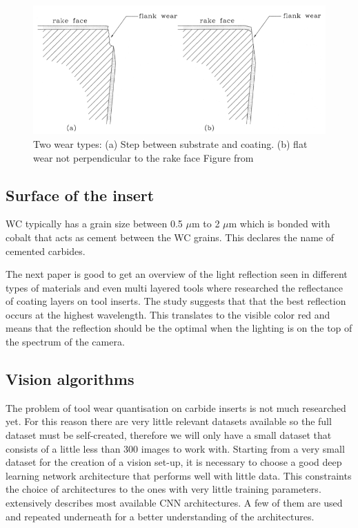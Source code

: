 	\begin{figure}[hbtp]
	\centering
	\includegraphics[scale=0.4]{fig/algemeen/plaatjes/Figuren/wear_types.png}
	\caption{Two wear types: (a) Step between substrate and coating. (b) flat wear not perpendicular to the rake face Figure from \citep{Gu1999}}
	\label{fig:gen:insertwears}
	\end{figure}

			
\subsection{Surface of the insert}
\label{sec:lit:surface}
	WC typically has a grain size between 0.5 $\mu$m to 2 $\mu$m which is bonded with cobalt that acts as cement between the WC grains. This declares the name of cemented carbides.
			
			
 The next paper is good to get an overview of the light reflection seen in different types of materials and even multi layered tools where
	\cite{Caicedo2019} researched the reflectance of coating layers on tool inserts. The study suggests that that the best reflection occurs at the highest wavelength. This translates to the visible color red and means that the reflection should be the optimal when the lighting is on the top of the spectrum of the camera. 

		
\subsection{Vision algorithms}
		The problem of tool wear quantisation on carbide inserts is not much researched yet. For this reason there are very little relevant datasets available so the full dataset must be self-created, therefore we will only have a small dataset that consists of a little less than 300 images to work with. Starting from a very small dataset for the creation of a vision set-up, it is necessary to choose a good deep learning network architecture that performs well with little data. This constraints the choice of architectures to the ones with very little training parameters. \cite{Khan2020} extensively describes most available CNN architectures. A few of them are used and repeated underneath for a better understanding of the architectures.
		
